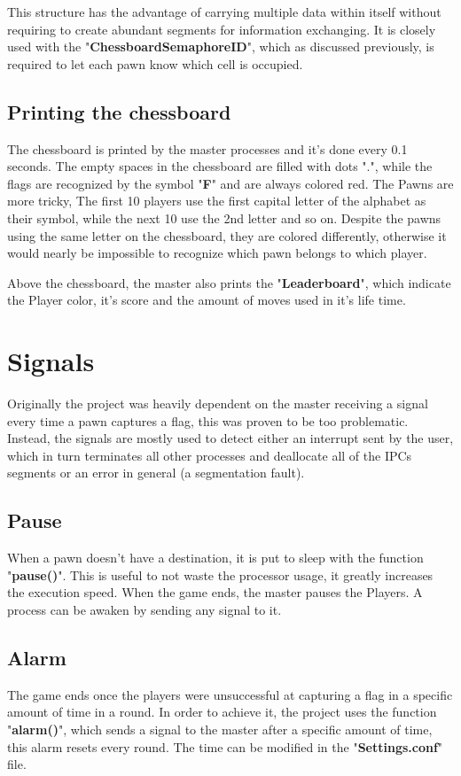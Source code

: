 \documentclass[11pt]{article}
\begin{document}
    This structure has the advantage of carrying multiple data within itself without requiring to create abundant segments for information exchanging. It is closely used with the "\textbf{ChessboardSemaphoreID}", which as discussed previously, is required to let each pawn know which cell is occupied.
    
    \subsection{Printing the chessboard}
    
	The chessboard is printed by the master processes and it's done every 0.1 seconds. The empty spaces in the chessboard are filled with dots ".", while the flags are recognized by the symbol "\textbf{F}" and are always colored red. The Pawns are more tricky, The first 10 players use the first capital letter of the alphabet as their symbol, while the next 10 use the 2nd letter and so on. Despite the pawns using the same letter on the chessboard, they are colored differently, otherwise it would nearly be impossible to recognize which pawn belongs to which player.
	
	Above the chessboard, the master also prints the "\textbf{Leaderboard}", which indicate the Player color, it's score and the amount of moves used in it's life time.
	
	\section{Signals}
	
	Originally the project was heavily dependent on the master receiving a signal every time a pawn captures a flag, this was proven to be too problematic. Instead, the signals are mostly used to detect either an interrupt sent by the user, which in turn terminates all other processes and deallocate all of the IPCs segments or an error in general (a segmentation fault).
	
	\subsection{Pause}
	When a pawn doesn't have a destination, it is put to sleep with the function "\textbf{pause()}". This is useful to not waste the processor usage, it greatly increases the execution speed. When the game ends, the master pauses the Players. A process can be awaken by sending any signal to it.
	
	\subsection{Alarm}
	The game ends once the players were unsuccessful at capturing a flag in a specific amount of time in a round. In order to achieve it, the project uses the function "\textbf{alarm()}", which sends a signal to the master after a specific amount of time, this alarm resets every round. The time can be modified in the "\textbf{Settings.conf}" file.
	
\end{document}
